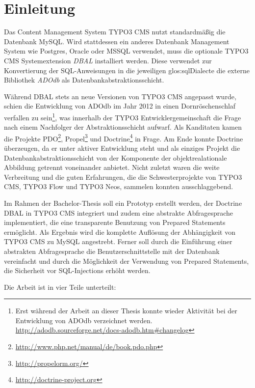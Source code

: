 \chapter{Einleitung}
\label{ch:intro}
Das Content Management System TYPO3 CMS nutzt standardmäßig die Datenbank MySQL. Wird stattdessen ein anderes Datenbank Management System wie Postgres, Oracle oder MSSQL verwendet, muss die optionale TYPO3 CMS Systemextension \textit{DBAL} installiert werden. Diese verwendet zur Konvertierung der SQL-Anweisungen in die jeweiligen \gls{glos:sqlDialect}e die externe Bibliothek \textit{ADOdb} als Datenbankabstraktionsschicht.

Während DBAL stets an neue Versionen von TYPO3 CMS angepasst wurde, schien die Entwicklung von ADOdb im Jahr 2012 in einen Dornröschenschlaf verfallen zu sein\footnote{Erst während der Arbeit an dieser Thesis konnte wieder Aktivität bei der Entwicklung von ADOdb verzeichnet werden. \url{http://adodb.sourceforge.net/docs-adodb.htm\#changelog}}, was innerhalb der TYPO3 Entwicklergemeinschaft die Frage nach einem Nachfolger der Abstraktionsschicht aufwarf. Als Kanditaten kamen die Projekte PDO\footnote{\url{http://www.php.net/manual/de/book.pdo.php}}, Propel\footnote{\url{http://propelorm.org/}} und Doctrine\footnote{\url{http://doctrine-project.org}} in Frage. Am Ende konnte Doctrine überzeugen, da er unter aktiver Entwicklung steht und als einziges Projekt die Datenbankabstraktionsschicht von der Komponente der objektrealationale Abbildung getrennt voneinander anbietet. Nicht zuletzt waren die weite Verbreitung und die guten Erfahrungen, die die Schwesterprojekte von TYPO3 CMS, TYPO3 Flow und TYPO3 Neos, sammelen konnten ausschlaggebend.

Im Rahmen der Bachelor-Thesis soll ein Prototyp erstellt werden, der Doctrine DBAL in TYPO3 CMS integriert und zudem eine abstrakte Abfragesprache implementiert, die eine transparente Benutzung von Prepared Statements ermöglicht. Als Ergebnis wird die komplette Auflösung der Abhängigkeit von TYPO3 CMS zu MySQL angestrebt. Ferner soll durch die Einführung einer abstrakten Abfragesprache die Benutzerschnittstelle mit der Datenbank vereinfacht und durch die Möglichkeit der Verwendung von Prepared Statements, die Sicherheit vor SQL-Injections erhöht werden.

Die Arbeit ist in vier Teile unterteilt:

